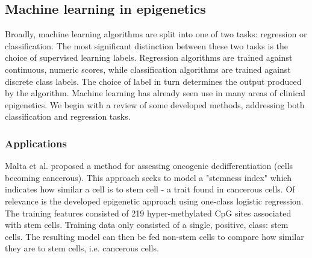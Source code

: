 \documentclass{article} %
\begin{document}


\subsection{Machine learning in epigenetics}
Broadly, machine learning algorithms are split into one of two tasks: regression or classification. The most significant distinction between these two tasks is the choice of supervised learning labels. Regression algorithms are trained against continuous, numeric scores, while classification algorithms are trained against discrete class labels. The choice of label in turn determines the output produced by the algorithm.
Machine learning has already seen use in many areas of clinical epigenetics. We begin with a review of some developed methods, addressing both classification and regression tasks.

\subsubsection{Applications} \label{sec:ml-examples}

Malta et al. \cite{malta2018machine} proposed a method for assessing oncogenic dedifferentiation (cells becoming cancerous). This approach seeks to model a "stemness index" which indicates how similar a cell is to stem cell - a trait found in cancerous cells. Of relevance is the developed epigenetic approach using one-class logistic regression. The training features consisted of 219 hyper-methylated CpG sites associated with stem cells. Training data only consisted of a single, positive, class: stem cells. The resulting model can then be fed non-stem cells to compare how similar they are to stem cells, i.e. cancerous cells.
\end{document}

